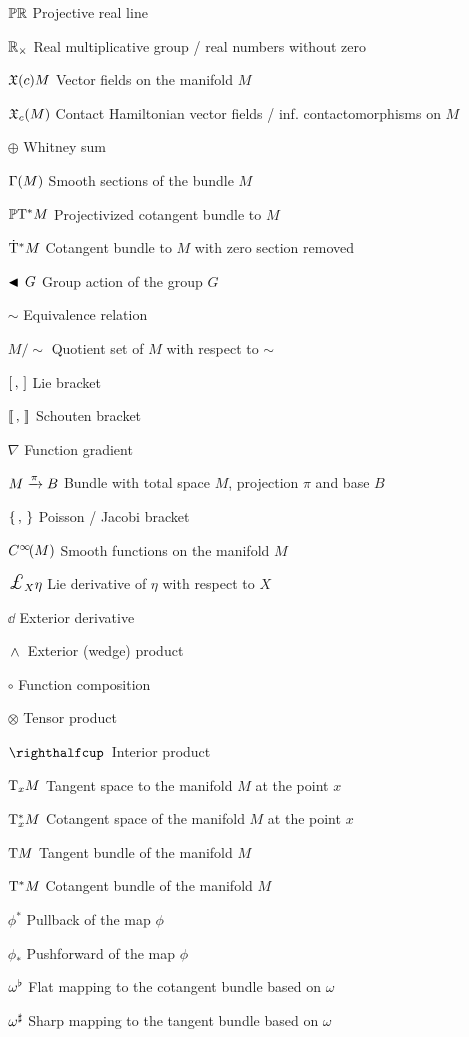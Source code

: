\begin{itemize}[itemsep=0pt, leftmargin=3.4cm, labelsep=0cm, labelwidth=3.3cm, align=left]
%
    \item[$\mathbb{P}\mathbb{R}$] Projective real line
    \item[$\mathbb{R}_{\times}$] Real multiplicative group / real numbers without zero
%
%
    \item[$\mathfrak{X}\qty(c){M}$]  Vector fields on the manifold $M$
    \item[$\mathfrak{X}_{c}\qty(M)$]  Contact Hamiltonian vector fields / inf. contactomorphisms on $M$
    \item[$\oplus$]  Whitney sum
    \item[$\mathrm{\Gamma}\qty(M)$]  Smooth sections of the bundle $M$ 
    \item[$\mathbb{P}\mathrm{T}^* M$]  Projectivized cotangent bundle to $M$
    \item[$\mathrm{\dot{T}}^*M$]  Cotangent bundle to $M$ with zero section removed
    \item[$\blacktriangleleft\,G$]  Group action of the group $G$
    \item[$\sim$]  Equivalence relation
    \item[$M / \sim$]  Quotient set of $M$ with respect to $\sim$
    \item[$\qty[\,,\,]$]  Lie bracket
    \item[$\llbracket\,,\,\rrbracket$]  Schouten bracket
    \item[$\nabla$]  Function gradient
    \item[$M\xrightarrow[]{\pi}B$]  Bundle with total space $M$, projection $\pi$ and base $B$
    \item[$\qty{\,,\,}$]  Poisson / Jacobi bracket
    \item[$C^\infty\!\qty(M)$]  Smooth functions on the manifold $M$
    \item[$\lied{X}{\eta}$]  Lie derivative of $\eta$ with respect to $X$
    \item[$\dd{}$]  Exterior derivative
    \item[$ \,\wedge\, $]  Exterior (wedge) product
    \item[$\circ$]  Function composition
    \item[$\otimes$]  Tensor product
    \item[$\intpr{}{}$]  Interior product
    \item[$\mathrm{T}_{x} M$]  Tangent space to the manifold $M$ at the point $x$
    \item[$\mathrm{T}_{x}^*M$]  Cotangent space of the manifold $M$ at the point $x$
    \item[$\mathrm{T}M$]  Tangent bundle of the manifold $M$
    \item[$\mathrm{T}^*M$]  Cotangent bundle of the manifold $M$
    \item[$\phi^*$]  Pullback of the map $\phi$
    \item[$\phi_*$]  Pushforward of the map $\phi$
    \item[$\omega^\flat$]  Flat mapping to the cotangent bundle  based on $\omega$
    \item[$\omega^\sharp$]  Sharp mapping to the tangent bundle based on $\omega$
\end{itemize}